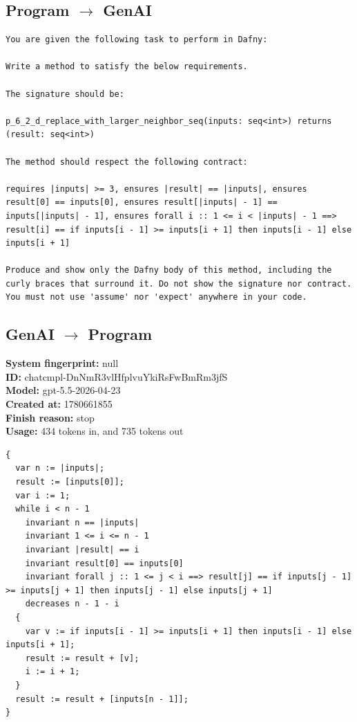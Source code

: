 \documentclass{article}
\begin{document}
\subsection*{Program $\rightarrow$ GenAI}
\begin{lstlisting}
You are given the following task to perform in Dafny:

Write a method to satisfy the below requirements.

The signature should be:

p_6_2_d_replace_with_larger_neighbor_seq(inputs: seq<int>) returns (result: seq<int>)

The method should respect the following contract:

requires |inputs| >= 3, ensures |result| == |inputs|, ensures result[0] == inputs[0], ensures result[|inputs| - 1] == inputs[|inputs| - 1], ensures forall i :: 1 <= i < |inputs| - 1 ==> result[i] == if inputs[i - 1] >= inputs[i + 1] then inputs[i - 1] else inputs[i + 1]

Produce and show only the Dafny body of this method, including the curly braces that surround it. Do not show the signature nor contract. You must not use 'assume' nor 'expect' anywhere in your code.
\end{lstlisting}
\subsection*{GenAI $\rightarrow$ Program}
\textbf{System fingerprint: }null
\\\textbf{ID: }chatcmpl-DnNmR3vlHfplvuYkiRsFwBmRm3jfS
\\\textbf{Model: }gpt-5.5-2026-04-23
\\\textbf{Created at: }1780661855
\\\textbf{Finish reason: }stop
\\\textbf{Usage: }434 tokens in, and 735 tokens out
\begin{lstlisting}
{
  var n := |inputs|;
  result := [inputs[0]];
  var i := 1;
  while i < n - 1
    invariant n == |inputs|
    invariant 1 <= i <= n - 1
    invariant |result| == i
    invariant result[0] == inputs[0]
    invariant forall j :: 1 <= j < i ==> result[j] == if inputs[j - 1] >= inputs[j + 1] then inputs[j - 1] else inputs[j + 1]
    decreases n - 1 - i
  {
    var v := if inputs[i - 1] >= inputs[i + 1] then inputs[i - 1] else inputs[i + 1];
    result := result + [v];
    i := i + 1;
  }
  result := result + [inputs[n - 1]];
}
\end{lstlisting}
\end{document}
